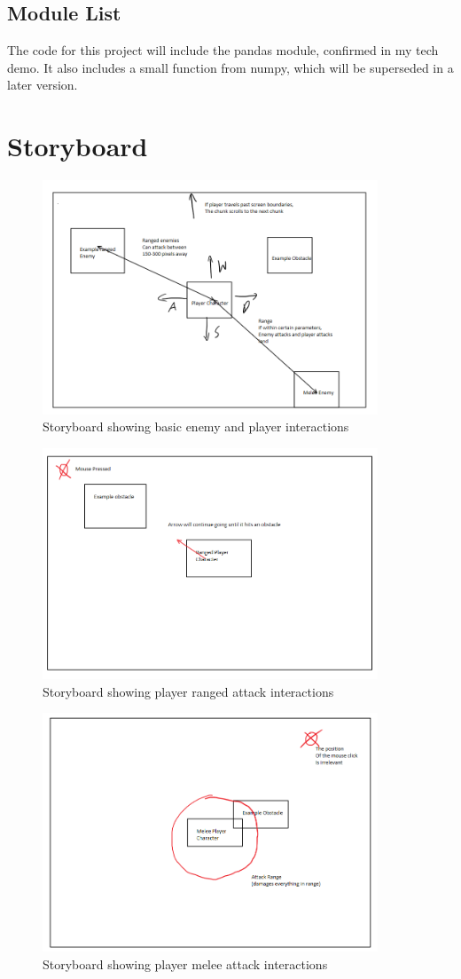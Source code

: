 \documentclass[12pt]{article}
\begin{document}
\subsection{Module List}
The code for this project will include the pandas module, confirmed in 
my tech demo. It also includes a small function from numpy, which will
be superseded in a later version. 
\newpage
\section{Storyboard}
\begin{figure}[h]
    \centering
    \includegraphics[width = 10cm]{Storyboard0.PNG}
    \caption{Storyboard showing basic enemy and player interactions}
\end{figure}
\begin{figure}[b]
    \centering
    \includegraphics[width = 10cm]{Storyboard1.PNG}
    \caption{Storyboard showing player ranged attack interactions}
\end{figure}
\begin{figure}[h]
    \centering
    \includegraphics[width = 10cm]{Storyboard2.PNG}
    \caption{Storyboard showing player melee attack interactions}
\end{figure}
\end{document}
